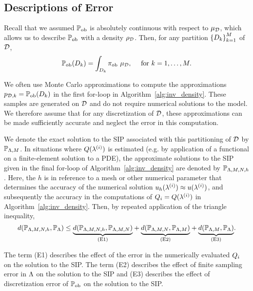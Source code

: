 \subsection{Descriptions of Error}\label{sec:set-error}

Recall that we assumed $\operatorname*{\mathbb{P}_{ob}}$ is absolutely continuous with respect to $\mu_{\mathcal{D}}$, which allows us to describe $\operatorname*{\mathbb{P}_{ob}}$ with a density $\rho_{\mathcal{D}}$. Then, for any partition $\left\{D_k\right\}_{k=1}^{M}$ of $\mathcal{D}$,
\[
\operatorname*{\mathbb{P}_{ob}} (D_k) = \int_{D_k} \operatorname*{\pi_{ob}} \, \mu_{\mathcal{D}}, \quad \text{ for } k = 1, \hdots, M.
\]

We often use Monte Carlo approximations to compute the approximations $p_{\mathcal{D}, k}=\operatorname*{\mathbb{P}_{ob}}(D_k)$ in the first for-loop in Algorithm~\ref{alg:inv_density}.
These samples are generated on $\mathcal{D}$ and do not require numerical solutions to the model.
We therefore assume that for any discretization of $\mathcal{D}$, these approximations can be made sufficiently accurate and neglect the error in this computation.

We denote the exact solution to the SIP associated with this partitioning of $\mathcal{D}$ by $\mathbb{P}_{{\Lambda}, M}$.
In situations where $Q(\lambda^{(i)})$ is estimated (e.g. by application of a functional on a finite-element solution to a PDE), the approximate solutions to the SIP given in the final for-loop of Algorithm~\ref{alg:inv_density} are denoted by $\mathbb{P}_{{\Lambda}, M, N, h}$.
Here, the $h$ is in reference to a mesh or other numerical parameter that determines the accuracy of the numerical solution $u_h(\lambda^{(i)})\approx u(\lambda^{(i)})$, and subsequently the accuracy in the computations of $Q_i = Q(\lambda^{(i)})$ in Algorithm~\ref{alg:inv_density}.
Then, by repeated application of the triangle inequality,
\begin{equation}
\label{eq:set-triangleineq}
d(\mathbb{P}_{{\Lambda}, M, N, h}, \mathbb{P}_{\Lambda}) \leq
\underset{ \text{(E1)} }{\underbrace{d(\mathbb{P}_{{\Lambda}, M, N, h},\mathbb{P}_{{\Lambda}, M, N})}} +
\underset{ \text{(E2)} }{\underbrace{d(\mathbb{P}_{{\Lambda}, M, N}, \mathbb{P}_{{\Lambda}, M}) }}+
\underset{ \text{(E3)} }{\underbrace{d(\mathbb{P}_{{\Lambda}, M}, \mathbb{P}_{\Lambda}) }}.
\end{equation}

The term (E1) describes the effect of the error in the numerically evaluated $Q_i$ on the solution to the SIP.
The term (E2) describes the effect of finite sampling error in ${\Lambda}$ on the solution to the SIP and (E3) describes the effect of discretization error of $\operatorname*{\mathbb{P}_{ob}}$ on the solution to the SIP.

